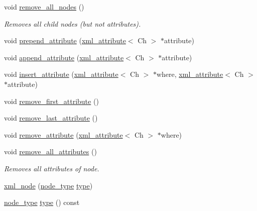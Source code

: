 \begin{DoxyCompactItemize}
void \mbox{\hyperlink{classrapidxml_1_1xml__node_a95735358b079ae0adcfbbac69aa1fbc3}{remove\+\_\+all\+\_\+nodes}} ()
\begin{DoxyCompactList}\small\item\em Removes all child nodes (but not attributes). \end{DoxyCompactList}\item 
void \mbox{\hyperlink{classrapidxml_1_1xml__node_a8b62ee76489faf8e2d1210869d547684}{prepend\+\_\+attribute}} (\mbox{\hyperlink{classrapidxml_1_1xml__attribute}{xml\+\_\+attribute}}$<$ Ch $>$ $\ast$attribute)
\item 
void \mbox{\hyperlink{classrapidxml_1_1xml__node_a33ce3386f8c42dd4db658b75cbb6e6c4}{append\+\_\+attribute}} (\mbox{\hyperlink{classrapidxml_1_1xml__attribute}{xml\+\_\+attribute}}$<$ Ch $>$ $\ast$attribute)
\item 
void \mbox{\hyperlink{classrapidxml_1_1xml__node_a9fe659cdf4a5b3bbf5e8ffc98db5a84f}{insert\+\_\+attribute}} (\mbox{\hyperlink{classrapidxml_1_1xml__attribute}{xml\+\_\+attribute}}$<$ Ch $>$ $\ast$where, \mbox{\hyperlink{classrapidxml_1_1xml__attribute}{xml\+\_\+attribute}}$<$ Ch $>$ $\ast$attribute)
\item 
void \mbox{\hyperlink{classrapidxml_1_1xml__node_aa95192d2a165cca16c551ed2a2a06aec}{remove\+\_\+first\+\_\+attribute}} ()
\item 
void \mbox{\hyperlink{classrapidxml_1_1xml__node_a1781a2cbedc9a51d609ad5b528125635}{remove\+\_\+last\+\_\+attribute}} ()
\item 
void \mbox{\hyperlink{classrapidxml_1_1xml__node_a6f97b1b4f46a94a4587915df3c0c6b57}{remove\+\_\+attribute}} (\mbox{\hyperlink{classrapidxml_1_1xml__attribute}{xml\+\_\+attribute}}$<$ Ch $>$ $\ast$where)
\item 
void \mbox{\hyperlink{classrapidxml_1_1xml__node_aa8d5d9484aa1eb5ff1841a073c84c1aa}{remove\+\_\+all\+\_\+attributes}} ()
\begin{DoxyCompactList}\small\item\em Removes all attributes of node. \end{DoxyCompactList}\item 
\mbox{\hyperlink{classrapidxml_1_1xml__node_a8bd9019960b90605a45998b661fb1b0e}{xml\+\_\+node}} (\mbox{\hyperlink{namespacerapidxml_abb456db38f7efb746c4330eed6072a7c}{node\+\_\+type}} \mbox{\hyperlink{classrapidxml_1_1xml__node_a5f91729128856b0aaab598d4364ace60}{type}})
\item 
\mbox{\hyperlink{namespacerapidxml_abb456db38f7efb746c4330eed6072a7c}{node\+\_\+type}} \mbox{\hyperlink{classrapidxml_1_1xml__node_a5f91729128856b0aaab598d4364ace60}{type}} () const

\end{DoxyCompactItemize}

